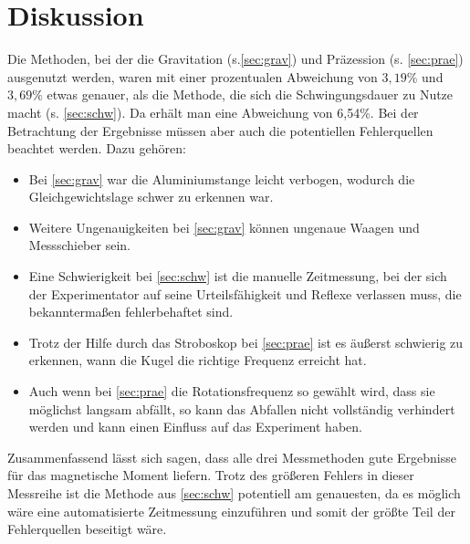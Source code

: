 \section{Diskussion}
Die Methoden, bei der die Gravitation (s.\ref{sec:grav}) und Präzession (s. \ref{sec:prae}) ausgenutzt werden,
waren mit einer prozentualen Abweichung von $3,19\%$ und $3,69\%$ etwas genauer, als die Methode,
die sich die Schwingungsdauer zu Nutze macht (s. \ref{sec:schw}). Da erhält man eine Abweichung von 6,54\%.
Bei der Betrachtung der Ergebnisse müssen aber auch die potentiellen Fehlerquellen beachtet werden.
Dazu gehören:

\begin{itemize}
  \item Bei \ref{sec:grav} war die Aluminiumstange leicht verbogen,
        wodurch die Gleichgewichtslage schwer zu erkennen war.
  \item Weitere Ungenauigkeiten bei \ref{sec:grav} können ungenaue Waagen und Messschieber sein.
  \item Eine Schwierigkeit bei \ref{sec:schw} ist die manuelle Zeitmessung, bei der sich der Experimentator
        auf seine Urteilsfähigkeit und Reflexe verlassen muss, die bekanntermaßen fehlerbehaftet sind.
  \item Trotz der Hilfe durch das Stroboskop bei \ref{sec:prae} ist es äußerst schwierig zu erkennen, wann die Kugel
        die richtige Frequenz erreicht hat.
  \item Auch wenn bei \ref{sec:prae} die Rotationsfrequenz so gewählt wird, dass sie möglichst langsam abfällt,
        so kann das Abfallen nicht vollständig verhindert werden und kann einen Einfluss auf das Experiment haben.
\end{itemize}
Zusammenfassend lässt sich sagen, dass alle drei Messmethoden gute Ergebnisse für das magnetische Moment liefern.
Trotz des größeren Fehlers in dieser Messreihe ist die Methode aus \ref{sec:schw} potentiell am genauesten,
da es möglich wäre eine automatisierte Zeitmessung einzuführen und somit der größte Teil der Fehlerquellen beseitigt wäre.
